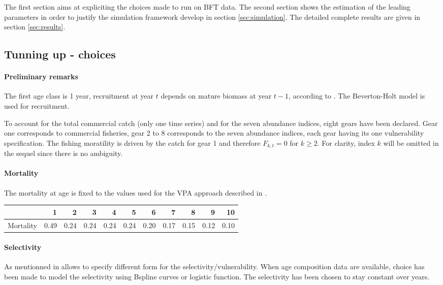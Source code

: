 The first section  aims at expliciting the choices made  to run \iscam
on BFT  data. The second section  shows the estimation of  the leading
parameters in  order to  justify the  simulation framework  develop in
section \ref{sec:simulation}. The detailed  complete results are given
in section \ref{sec:results}.




\subsection{Tunning up \iscam - choices}

\paragraph{Preliminary remarks}
The first age class is 1 year, recruitment at year $t$ depends on
mature  biomass  at  year  $t-1$,  according  to  \cite{tuna2012}.  The
Beverton-Holt model is used for recruitment.


To account for the total commercial catch (only one time series) and
for the seven abundance indices,  eight gears have been declared. Gear
one corresponds  to commercial fisheries,  gear 2 to 8  corresponds to
the seven  abundance indices, each  gear having its  one vulnerability
specification. The fishing moratility is  driven by the catch for gear
1 and  therefore $F_{k,t}=0$ for  $k \geq  2$. For clarity,  index $k$
will be omitted in the sequel since there is no ambiguity.

\paragraph{Mortality}
The mortality at age is fixed to  the values used for the VPA approach
described in \cite{tuna2012}.

\begin{table}[ht]
\centering
\begin{tabular}{rrrrrrrrrrr}
  \hline
 & 1 & 2 & 3 & 4 & 5 & 6 & 7 & 8 & 9 & 10 \\ 
  \hline
Mortality & 0.49 & 0.24 & 0.24 & 0.24 & 0.24 & 0.20 & 0.17 & 0.15 & 0.12 & 0.10 \\ 
   \hline
\end{tabular}
\end{table}


\paragraph{Selectivity}
As mentionned in \iscam allows to specify different form for the
selectivity/vulnerability.  When age composition data are available,
choice has been made to model  the selectivity using Bspline curves or
logistic function.  The selectivity has  been chosen to  stay constant
over years.


